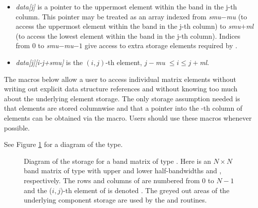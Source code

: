\begin{itemize}
\begin{itemize}
  \item {\em data[j]} is a pointer to the uppermost element within the band  
    in the j-th column. This pointer may be treated as   
    an array indexed from {\em smu}$-${\em mu} (to access the         
    uppermost element within the band in the j-th        
    column) to {\em smu}$+${\em ml} (to access the lowest element     
    within the band in the j-th column). Indices from $0$ 
    to {\em smu}$-${\em mu}$-1$ give access to extra storage elements   
    required by .                          
    
  \item {\em data[j][i-j+smu]} is the $(i,j)$-th element, 
    $j-${\em mu} $\le i \le j+${\em ml}.    
  \end{itemize}

\end{itemize}               
                                                  
The macros below allow a user to access individual matrix      
elements without writing out explicit data structure           
references and without knowing too much about the underlying   
element storage. The only storage assumption needed is that    
elements are stored columnwise and that a pointer into the -th 
column of elements can be obtained via the  macro.
Users should use these macros whenever possible.                                      

See Figure \ref{f:bandmat} for a diagram of the  type.

\begin{figure}
\centerline{}
\caption[Diagram of the storage for a matrix of type ]
  {Diagram of the storage for a band matrix of type . Here  is an
  $N \times N$ band matrix of type  with upper and lower half-bandwidths 
  and , respectively. The rows and columns of  are numbered from $0$ to $N-1$
  and the ($i,j$)-th element of  is denoted . The greyed out areas of
  the underlying component storage are used by the  and
   routines.}\label{f:bandmat}
\end{figure}

 

